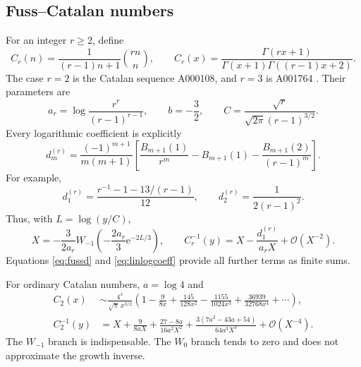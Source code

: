 \documentclass[11pt,a4paper]{article}
\theoremstyle{definition}
\theoremstyle{remark}
\newcommand{\ee}{\mathrm e}
\newcommand{\OO}{\mathcal O}
\numberwithin{equation}{section}
\begin{document}
\subsection{Fuss--Catalan numbers}
For an integer $r\ge2$, define
\begin{equation}
 C_r(n)=\frac1{(r-1)n+1}\binom{rn}{n},\qquad
 C_r(x)=\frac{\Gamma(rx+1)}{\Gamma(x+1)\Gamma((r-1)x+2)}.
 \label{eq:fuss}
\end{equation}
The case $r=2$ is the Catalan sequence A000108, and $r=3$ is A001764 \cite{oeiscatalan,oeisfuss}. Their parameters are
\begin{equation}
 a_r=\log\frac{r^r}{(r-1)^{r-1}},\qquad
 b=-\frac32,\qquad
 C=\frac{\sqrt r}{\sqrt{2\pi}(r-1)^{3/2}}.
 \label{eq:fussparameters}
\end{equation}
Every logarithmic coefficient is explicitly
\begin{equation}
 d_m^{(r)}=\frac{(-1)^{m+1}}{m(m+1)}
 \left[\frac{B_{m+1}(1)}{r^m}-B_{m+1}(1)
 -\frac{B_{m+1}(2)}{(r-1)^m}\right].
 \label{eq:fussd}
\end{equation}
For example,
\[
 d_1^{(r)}=\frac{r^{-1}-1-13/(r-1)}{12},\qquad
 d_2^{(r)}=\frac1{2(r-1)^2}.
\]
Thus, with $L=\log(y/C)$,
\begin{equation}
 X=-\frac3{2a_r}W_{-1}\!\left(-\frac{2a_r}{3}\ee^{-2L/3}\right),
 \qquad
 C_r^{-1}(y)=X-\frac{d_1^{(r)}}{a_rX}+\OO(X^{-2}).
 \label{eq:fussinverse}
\end{equation}
Equations \eqref{eq:fussd} and \eqref{eq:linlogcoeff} provide all further terms as finite sums.

For ordinary Catalan numbers, $a=\log4$ and
\begin{align}
 C_2(x)&\sim\frac{4^x}{\sqrt\pi\,x^{3/2}}
 \left(1-\frac9{8x}+\frac{145}{128x^2}
 -\frac{1155}{1024x^3}+\frac{36939}{32768x^4}+\cdots\right),
 \label{eq:catalanforward}\\
 C_2^{-1}(y)&=X+\frac9{8aX}
 +\frac{27-8a}{16a^2X^2}
 +\frac{3(7a^2-43a+54)}{64a^3X^3}
 +\OO(X^{-4}).
 \label{eq:catalaninverse}
\end{align}
The $W_{-1}$ branch is indispensable. The $W_0$ branch tends to zero and does not approximate the growth inverse.
\end{document}
